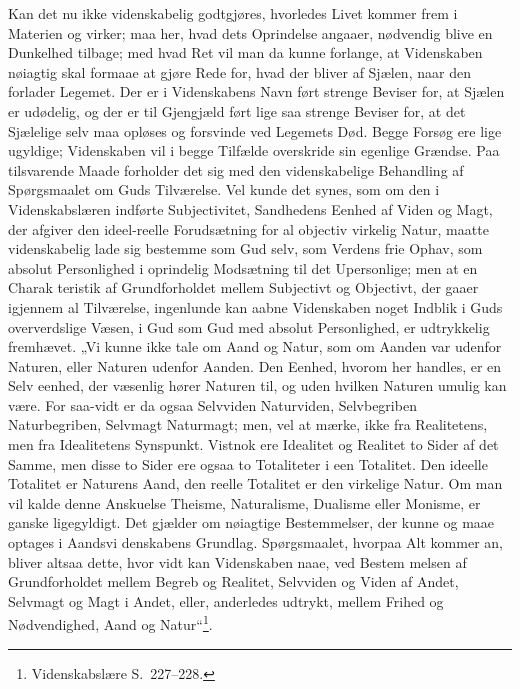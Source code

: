\documentclass[12pt,a4paper]{article}
\newcommand{\opage}[1]{\marginnote{\footnotesize\textit{[#1]}}}
\begin{document}
Kan det nu ikke videnskabelig godtgjøres, hvorledes Livet
kommer frem i Materien og virker; maa her, hvad dets Oprindelse
angaaer, nødvendig blive en Dunkelhed tilbage; med hvad Ret
vil man da kunne forlange, at Videnskaben nøiagtig skal formaae
at gjøre Rede for, hvad der bliver af Sjælen, naar den forlader
Legemet. Der er i Videnskabens Navn ført strenge Beviser for,
at Sjælen er udødelig, og der er til Gjengjæld ført lige saa strenge
Beviser for, at det Sjælelige selv maa opløses og forsvinde ved
Legemets Død. Begge Forsøg ere lige ugyldige; Videnskaben vil
i begge Tilfælde overskride sin egenlige Grændse. Paa tilsvarende
Maade forholder det sig med den videnskabelige Behandling af
Spørgsmaalet om Guds Tilværelse. Vel kunde det synes, som om
den i Videnskabslæren indførte Subjectivitet, Sandhedens Eenhed
af Viden og Magt, der afgiver den ideel-reelle Forudsætning for
al objectiv virkelig Natur, maatte videnskabelig lade sig bestemme
som Gud selv, som Verdens frie Ophav, som absolut Personlighed
i oprindelig Modsætning til det Upersonlige; men at en Charak\-%
teristik af Grundforholdet mellem Subjectivt og Objectivt, der gaaer
igjennem al Tilværelse, ingenlunde kan aabne Videnskaben noget
Indblik i Guds oververdslige Væsen, i Gud som Gud med absolut
Personlighed, er udtrykkelig fremhævet. „Vi kunne ikke tale om
Aand og Natur, som om Aanden var udenfor Naturen, eller Naturen
udenfor Aanden. Den Eenhed, hvorom her handles, er en Selv\-%
eenhed, der væsenlig hører Naturen til, og uden hvilken Naturen
umulig kan være. For saa-vidt er da ogsaa Selvviden Naturviden,
Selvbegriben Naturbegriben, Selvmagt Naturmagt; men, vel at
mærke, ikke fra Realitetens, men fra Idealitetens Synspunkt.
Vistnok ere Idealitet og Realitet to Sider af det Samme, men disse
to Sider ere ogsaa to Totaliteter i een Totalitet. Den ideelle
Totalitet er Naturens Aand, den reelle Totalitet er den virkelige
Natur. Om man vil kalde denne Anskuelse Theisme, Naturalisme,
Dualisme eller Monisme, er ganske ligegyldigt. Det gjælder om
nøiagtige Bestemmelser, der kunne og maae optages i Aandsvi\-%
\opage{43}denskabens Grundlag. Spørgsmaalet, hvorpaa Alt kommer an,
bliver altsaa dette, hvor vidt kan Videnskaben naae, ved Bestem\-%
melsen af Grundforholdet mellem Begreb og Realitet, Selvviden
og Viden af Andet, Selvmagt og Magt i Andet, eller, anderledes
udtrykt, mellem Frihed og Nødvendighed, Aand og Natur“\footnote{Videnskabslære S.\ 227--228.}. %
\end{document}
